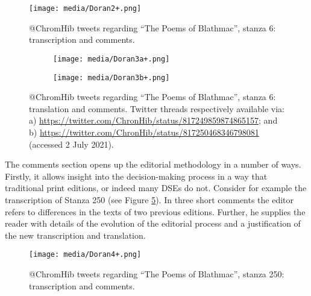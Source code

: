 \begin{paper}
\begin{figure}[ht]
    \centering
    \texttt{[image: media/Doran2+.png]}
    \caption[@ChromHib tweets regarding ``The Poems of Blathmac'', stanza 6: transcription and comments.]{@ChromHib tweets regarding ``The Poems of Blathmac'', stanza 6: transcription and comments.\footnotemark[2]}
    \label{fig:doran:stanza6transcription}
\end{figure}



\begin{figure}[p]
     \centering
     \begin{subfigure}[b]{.475\textwidth}
         \centering
         \texttt{[image: media/Doran3a+.png]}
         \caption{}
         \label{fig:doran:translation:1}
     \end{subfigure}
     \hfill
     \begin{subfigure}[b]{.475\textwidth}
         \centering
         \texttt{[image: media/Doran3b+.png]}
         \caption{}
         \label{fig:doran:translation:2}
     \end{subfigure}
     \hfill
        \caption{@ChromHib tweets regarding ``The Poems of Blathmac'', stanza 6: translation and comments. Twitter threads respectively available via: a) \url{https://twitter.com/ChronHib/status/817249859874865157}; and b) \url{https://twitter.com/ChronHib/status/817250468346798081} (accessed 2 July 2021).}
        \label{fig:doran:translation}
\end{figure}

\noindent The comments section opens up the editorial methodology in a number of ways. Firstly, it allows insight into the decision-making process in a way that traditional print editions, or indeed many DSEs do not. Consider for example  the transcription of Stanza 250 (see Figure \ref{fig:doran:stanza250}). In three short comments the editor refers to differences in the texts of two previous editions. Further, he supplies the reader with details of the evolution of the editorial process and a justification of the new transcription and translation.

\begin{figure}[H]
    \centering
    \texttt{[image: media/Doran4+.png]}
    \caption[@ChromHib tweets regarding ``The Poems of Blathmac'', stanza 250: transcription and comments.]{@ChromHib tweets regarding ``The Poems of Blathmac'', stanza 250: transcription and comments.\footnotemark[3]}
    \label{fig:doran:stanza250}
\end{figure}


\end{paper}
